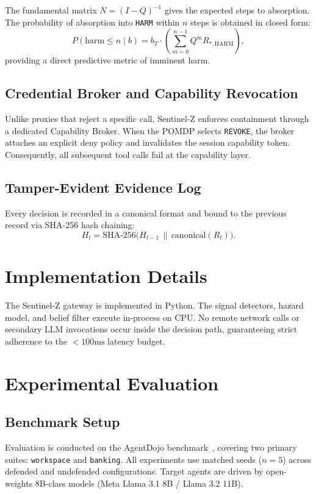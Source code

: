 \documentclass[conference]{IEEEtran}
\begin{document}
The fundamental matrix $N = (I - Q)^{-1}$ gives the expected steps to absorption. The probability of absorption into \texttt{HARM} within $n$ steps is obtained in closed form:
\begin{equation}
P(\text{harm} \le n \mid b) = b_T \cdot \left( \sum_{m=0}^{n-1} Q^m R_{*, \text{HARM}} \right),
\end{equation}
providing a direct predictive metric of imminent harm.

\subsection{Credential Broker and Capability Revocation}
Unlike proxies that reject a specific call, Sentinel-Z enforces containment through a dedicated Capability Broker. When the POMDP selects \texttt{REVOKE}, the broker attaches an explicit deny policy and invalidates the session capability token. Consequently, all subsequent tool calls fail at the capability layer.

\subsection{Tamper-Evident Evidence Log}
Every decision is recorded in a canonical format and bound to the previous record via SHA-256 hash chaining:
\begin{equation}
H_t = \text{SHA-256}\big( H_{t-1} \,\|\, \text{canonical}(R_t) \big).
\end{equation}

\section{Implementation Details}
The Sentinel-Z gateway is implemented in Python. The signal detectors, hazard model, and belief filter execute in-process on CPU. No remote network calls or secondary LLM invocations occur inside the decision path, guaranteeing strict adherence to the $<100\text{ms}$ latency budget.

\section{Experimental Evaluation}

\subsection{Benchmark Setup}
Evaluation is conducted on the AgentDojo benchmark~\cite{debenedetti2024agentdojo}, covering two primary suites: \texttt{workspace} and \texttt{banking}. All experiments use matched seeds ($n=5$) across defended and undefended configurations. Target agents are driven by open-weights 8B-class models (Meta Llama 3.1 8B / Llama 3.2 11B).
\end{document}
